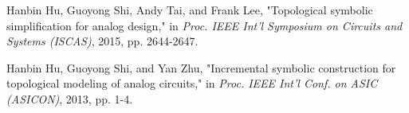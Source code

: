 
\begin{publications}{99}
	\item Hanbin Hu, Guoyong Shi, Andy Tai, and Frank Lee, "Topological symbolic simplification for analog design," in \textit{Proc. IEEE Int'l Symposium on Circuits and Systems (ISCAS)}, 2015, pp. 2644-2647.
    \item Hanbin Hu, Guoyong Shi, and Yan Zhu, "Incremental symbolic construction for topological modeling of analog circuits," in \textit{Proc. IEEE Int'l Conf. on ASIC (ASICON)}, 2013, pp. 1-4.
\end{publications}
